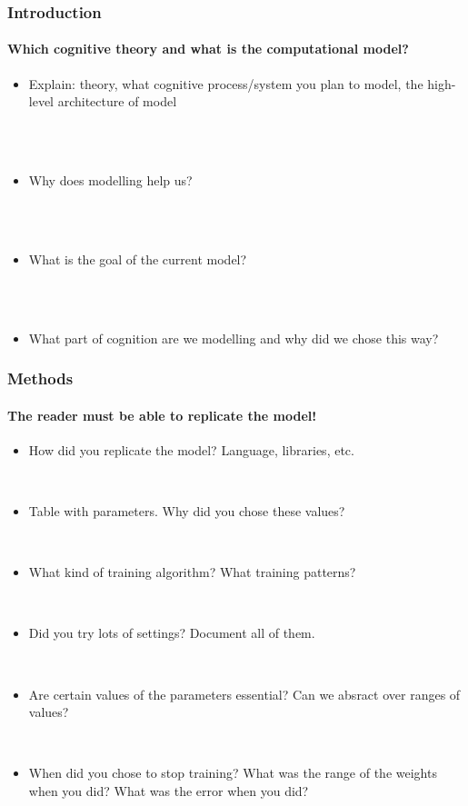 \documentclass{beamer}
\begin{document}
\begin{frame}
\frametitle{Introduction}
\framesubtitle{Which cognitive theory and what is the computational model?}
\begin{itemize}[<+->]


\item Explain: theory, what cognitive process/system you plan to model, the high-level architecture of model

\ \\

\ \\

\item Why does modelling help us?

\ \\

\ \\


\item What is the goal of the current model?

\ \\

\ \\


\item What part of cognition are we modelling and why did we chose this way?


\end{itemize}


\end{frame}

\begin{frame}
\frametitle{Methods}
\framesubtitle{The reader must be able to replicate the model!}
\begin{itemize}[<+->]


\item How did you replicate the model? Language, libraries, etc.

\ \\ 


 \item Table with parameters. Why did you chose these values?

\ \\


\item What kind of training algorithm? What training patterns?


\ \\


\item Did you try lots of settings? Document all of them. 

\ \\

\item Are certain values of the parameters essential? Can we absract over ranges of values?


\ \\


\item When did you chose to stop training? What was the range of the weights when you did? What was the error when you did?

\end{itemize}
\end{frame}
\end{document}
